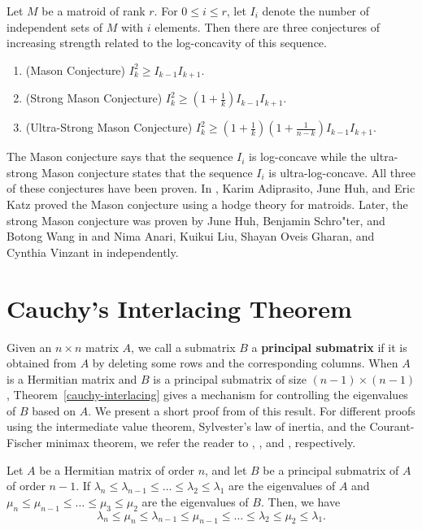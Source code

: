 \documentclass{puthesis-UG}
\begin{document}
\begin{example}
	Let $M$ be a matroid of rank $r$. For $0 \leq i \leq r$, let $I_i$ denote the number of independent sets of $M$ with $i$ elements. Then there are three conjectures of increasing strength related to the log-concavity of this sequence. 
	\begin{enumerate}
		\item (Mason Conjecture) $I_k^2 \geq I_{k-1} I_{k+1}$. 
		\item (Strong Mason Conjecture) $I_k^2 \geq \left (1 + \frac{1}{k} \right ) I_{k-1} I_{k+1}$. 
		\item (Ultra-Strong Mason Conjecture) $I_k^2 \geq \left (1 + \frac{1}{k} \right ) \left (1 + \frac{1}{n-k} \right ) I_{k-1} I_{k+1}$. 
	\end{enumerate}
	The Mason conjecture says that the sequence $I_i$ is log-concave while the ultra-strong Mason conjecture states that the sequence $I_i$ is ultra-log-concave. All three of these conjectures have been proven. In \cite{AHK}, Karim Adiprasito, June Huh, and Eric Katz proved the Mason conjecture using a hodge theory for matroids. Later, the strong Mason conjecture was proven by June Huh, Benjamin Schro"ter, and Botong Wang in \cite{correlation-bounds} and Nima Anari, Kuikui Liu, Shayan Oveis Gharan, and Cynthia Vinzant in \cite{anari2018logconcave} independently.  
\end{example}

\section{Cauchy's Interlacing Theorem} \label{sec:cauchy-interlacing-theorem}

Given an $n \times n$ matrix $A$, we call a submatrix $B$ a \textbf{principal submatrix} if it is obtained from $A$ by deleting some rows and the corresponding columns. When $A$ is a Hermitian matrix and $B$ is a principal submatrix of size $(n-1) \times (n-1)$, Theorem~\ref{cauchy-interlacing} gives a mechanism for controlling the eigenvalues of $B$ based on $A$. We present a short proof from \cite{fisk} of this result. For different proofs using the intermediate value theorem, Sylvester's law of inertia, and the Courant-Fischer minimax theorem, we refer the reader to \cite{suk}, \cite{symmetric-eigenvalue-problem}, and \cite{GoluVanl96}, respectively. 

\begin{thm} \label{cauchy-interlacing}
	Let $A$ be a Hermitian matrix of order $n$, and let $B$ be a principal submatrix of $A$ of order $n-1$. If $\lambda_n \leq \lambda_{n-1} \leq \ldots \leq \lambda_2 \leq \lambda_1$ are the eigenvalues of $A$ and $\mu_n \leq \mu_{n-1} \leq \ldots \leq \mu_3 \leq \mu_2$ are the eigenvalues of $B$. Then, we have
	\[
		\lambda_n \leq \mu_n \leq \lambda_{n-1} \leq \mu_{n-1} \leq \ldots \leq \lambda_2 \leq \mu_2 \leq \lambda_1.
	\]
\end{thm}
\end{document}
